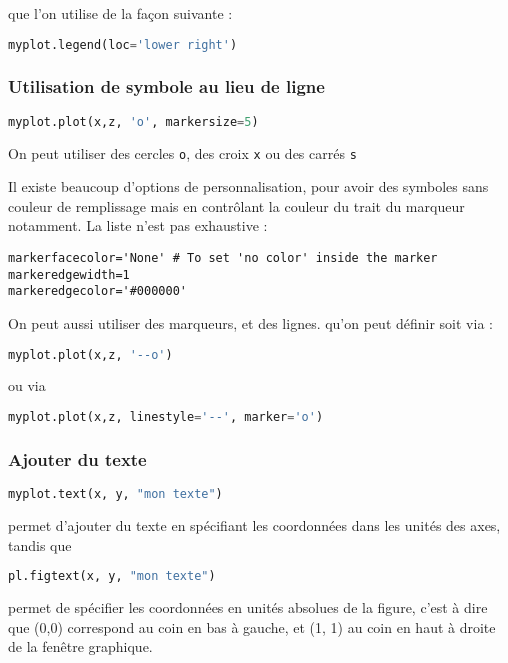 \documentclass[a4paper,twoside]{article}
\begin{document}
que l'on utilise de la façon suivante :
 \begin{lstlisting}[language=python]
myplot.legend(loc='lower right')
\end{lstlisting}


\subsubsection{Utilisation de symbole au lieu de ligne}
\begin{lstlisting}[language=python]
myplot.plot(x,z, 'o', markersize=5)
\end{lstlisting}
On peut utiliser des cercles \texttt{o}, des croix \texttt{x} ou des carrés \texttt{s}

Il existe beaucoup d'options de personnalisation, pour avoir des symboles sans couleur de remplissage mais en contrôlant la couleur du trait du marqueur notamment. La liste n'est pas exhaustive : 
\begin{verbatim}
markerfacecolor='None' # To set 'no color' inside the marker
markeredgewidth=1
markeredgecolor='#000000'
\end{verbatim}

\bigskip

On peut aussi utiliser des marqueurs, et des lignes. qu'on peut définir soit via :
\begin{lstlisting}[language=python]
myplot.plot(x,z, '--o')
\end{lstlisting}
ou via
\begin{lstlisting}[language=python]
myplot.plot(x,z, linestyle='--', marker='o')
\end{lstlisting}

\subsubsection{Ajouter du texte}
\begin{lstlisting}[language=python]
myplot.text(x, y, "mon texte")
\end{lstlisting}
permet d'ajouter du texte en spécifiant les coordonnées dans les unités des axes, tandis que
\begin{lstlisting}[language=python]
pl.figtext(x, y, "mon texte")
\end{lstlisting}
permet de spécifier les coordonnées en unités absolues de la figure, c'est à dire que (0,0) correspond au coin en bas à gauche, et (1, 1) au coin en haut à droite de la fenêtre graphique.
\end{document}

